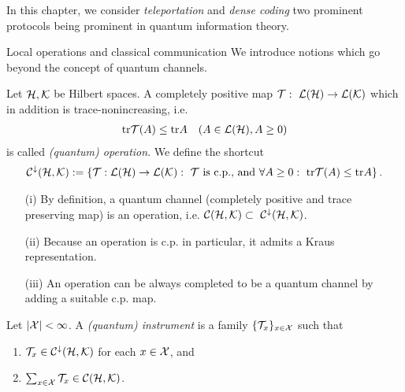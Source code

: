 In this chapter, we consider \emph{teleportation} and \emph{dense coding} two prominent protocols being prominent in quantum information theory. 


\begin{subsection}{Local operations and classical communication}
 We introduce notions which go beyond the concept of quantum channels. 
 
 \begin{definition}[Operation]
  Let ${\mathcal H}, {\mathcal K}$ be Hilbert spaces. A completely positive map ${\mathcal T}: \ {\mathcal L}({\mathcal H}) \rightarrow {\mathcal L}({\mathcal K})$ which in addition is trace-nonincreasing, i.e. 
  \begin{align}
   \mathrm{tr} {\mathcal T}(A) \leq \mathrm{tr} A &&(A \in {\mathcal L}({\mathcal H}), A \geq 0)
  \end{align}
  is called \emph{(quantum) operation}. We define the shortcut
  \begin{align}
   {\mathcal C}^{\downarrow}({\mathcal H}, {\mathcal K}) := \left\{{\mathcal T}: {\mathcal L}({\mathcal H}) \rightarrow {\mathcal L}({\mathcal K}): \ {\mathcal T} \ \text{is c.p., and} \ \forall A \geq 0: \ \mathrm{tr} {\mathcal T}(A) \leq \mathrm{tr} A  \right\}.
  \end{align}
 \end{definition}
 \begin{remark} 
  \begin{enumerate}
   \item [(i)] By definition, a quantum channel (completely positive and trace preserving map) is an operation, i.e. $\cC(\cH,\cK) \subset \ \cC^{\downarrow}(\cH,\cK)$.
   \item [(ii)] Because an operation is c.p. in particular, it admits a Kraus representation.
   \item [(iii)] An operation can be always completed to be a quantum channel by adding a suitable c.p. map.
  \end{enumerate}
 \end{remark}
 
 \begin{definition}[Instrument]
 Let $|{\mathcal X}| < \infty$. A \emph{(quantum) instrument} is a family $\{{\mathcal T}_x\}_{x \in {\mathcal X}}$ such that 
 \begin{enumerate}
  \item ${\mathcal T}_x \in {\mathcal C}^{\downarrow}({\mathcal H},{\mathcal K})$ for each $x \in {\mathcal X}$, and
  \item $\sum_{x \in {\mathcal X}} {\mathcal T}_x \in {\mathcal C}({\mathcal H},{\mathcal K})$.
 \end{enumerate}
 \end{definition}
 

\end{subsection}
